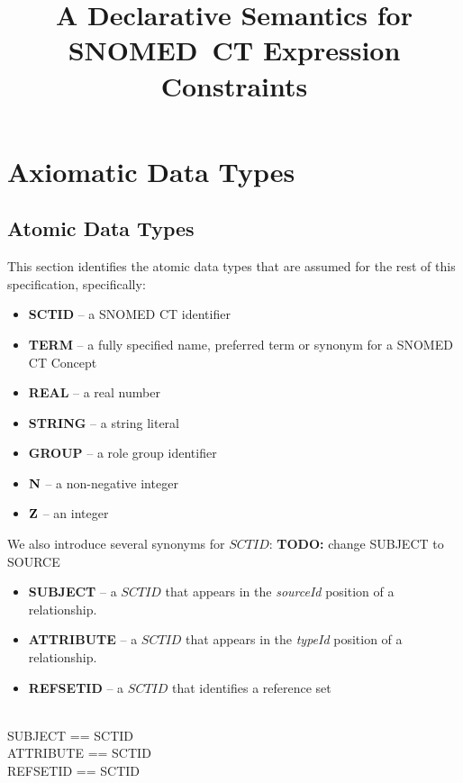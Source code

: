 \documentclass{article}
\title{A Declarative Semantics for SNOMED~CT Expression Constraints}
\begin{document}
\maketitle
\tableofcontents

\section{Axiomatic Data Types}
\subsection{Atomic Data Types}
This section identifies the atomic data types that are assumed for the rest of this specification, specifically:
\begin{itemize}[noitemsep]
\item \textbf{SCTID} -- a SNOMED CT identifier
\item \textbf{TERM} --  a  fully specified name, preferred term or synonym for a SNOMED CT Concept
\item \textbf{REAL} --  a real number
\item \textbf{STRING} -- a string literal
\item \textbf{GROUP} -- a role group identifier
\item \textbf{${\mathbf{N}}$} -- a non-negative integer
\item \textbf{${\mathbf{Z}}$} -- an integer
\end{itemize}


We also introduce several synonyms for $SCTID$:
\textbf{TODO:} change SUBJECT to SOURCE
\begin{itemize}[noitemsep]
\item \textbf{SUBJECT} -- a $SCTID$ that appears in the \emph{sourceId} position of a relationship.
\item \textbf{ATTRIBUTE} -- a $SCTID$ that appears in the \emph{typeId} position of a relationship.
\item \textbf{REFSETID} -- a $SCTID$ that identifies a reference set
\end{itemize}

\begin{zed}
 \\
\also
SUBJECT == SCTID \\
ATTRIBUTE == SCTID \\
REFSETID == SCTID 
\end{zed}
\end{document}
